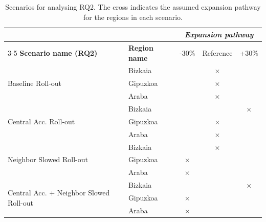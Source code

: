 \documentclass[preprint,review,11pt, authoryear]{elsarticle}
\begin{document}
        \begin{table}[H]
\centering
\caption{Scenarios for analysing RQ2. The cross indicates the assumed expansion pathway for the regions in each scenario.}
\label{tab:expansion_speed}
\begin{tabular}{llccc}
\hline
                                                         &                      & \multicolumn{3}{c}{\textit{\textbf{Expansion pathway}}} \\ \cline{3-5} 
\textbf{Scenario name (RQ2)}                             & \textbf{Region name} & -30\%            & Reference         & +30\%            \\ \hline
\multirow{3}{*}{Baseline Roll-out}                       & Bizkaia              &                  & $\times$          &                  \\             
                                                         & Gipuzkoa             &                  & $\times$          &                  \\
                                                         & Araba                &                  & $\times$          &                \\ \hline
\multirow{3}{*}{Central Acc. Roll-out}                   & Bizkaia              &                  &                   & $\times$         \\ 
                                                         & Gipuzkoa             &                  & $\times$          &                  \\
                                                         & Araba                &                  & $\times$          &                  \\ \hline
\multirow{3}{*}{Neighbor Slowed Roll-out}                & Bizkaia                &          &  $\times$                  &                  \\
                                                         & Gipuzkoa             & $\times$         &                   &                  \\
                                                         & Araba              & $\times$                 &          &                  \\ \hline
\multirow{3}{*}{Central Acc. + Neighbor Slowed Roll-out} & Bizkaia                 &         &                   &    $\times$              \\
                                                         & Gipuzkoa             & $\times$         &                   &                  \\
                                                         & Araba             & $\times$                  &                   &          \\ \hline
\end{tabular}
\end{table}
\end{document}

